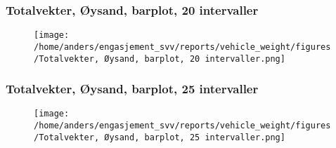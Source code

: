 \documentclass{article}
\begin{document}
\subsubsection{Totalvekter, Øysand, barplot, 20 intervaller}
\begin{figure}[H]
\centering
\texttt{[image: /home/anders/engasjement\_svv/reports/vehicle\_weight/figures/Totalvekter, Øysand, barplot, 20 intervaller.png]}
\end{figure}
\subsubsection{Totalvekter, Øysand, barplot, 25 intervaller}
\begin{figure}[H]
\centering
\texttt{[image: /home/anders/engasjement\_svv/reports/vehicle\_weight/figures/Totalvekter, Øysand, barplot, 25 intervaller.png]}
\end{figure}
\end{document}

